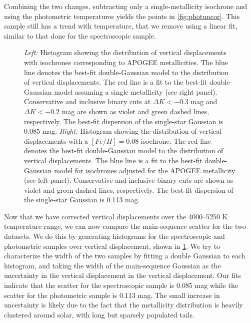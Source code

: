 \documentclass[manuscript]{aastex6}
\begin{document}
Combining the two changes, subtracting only a single-metallicity isochrone and
using the photometric temperatures yields the points in \cref{fig:photuncor}.
This sample still has a trend with temperature, that we remove using a linear
fit, similar to that done for the spectroscopic sample.

\begin{figure}[htb]
    \centering
    \caption{\emph{Left:} Histogram showing the distribution of vertical 
        displacements with isochrones corresponding to APOGEE metallicities.
        The blue line denotes the best-fit double-Gaussian model to the
        distribution of vertical displacements. The red line is a fit to the
        best-fit double-Gaussian model assuming a single metallicity (see right
        panel). Conservative and inclusive binary cuts at \(\Delta K < -0.3\)
        mag and \(\Delta K < -0.2\) mag are shown as violet and green dashed 
        lines, respectively. The best-fit dispersion of the single-star 
        Gaussian is 0.085 mag. \emph{Right:} Histogram showing the 
        distribution of vertical displacements with a \([Fe/H] = 0.08\) 
        isochrone. The red line denotes the best-fit double-Gaussian model to
        the distribution of vertical displacements. The blue line is a fit to
        the best-fit double-Gaussian model for isochrones adjusted for the
        APOGEE metallicity (see left panel). Conservative and inclusive binary
        cuts are shown as violet and green dashed lines, respectively. The
        best-fit dispersion of the single-star Gaussian is 0.113 
    mag.}\label{fig:histcompare}
\end{figure}

Now that we have corrected vertical displacements over the 4000--5250 K
temperature range, we can now compare the main-sequence scatter for the two
datasets. We do this by generating histograms for the spectroscopic and
photometric samples over vertical displacement, shown in
\cref{fig:histcompare}. We try to characterize the width of the two samples by
fitting a double Gaussian to each histogram, and taking the width of the
main-sequence Gaussian as the uncertainty in the vertical displacement in the
vertical displacement. Our fits indicate that the scatter for the spectroscopic
sample is 0.085 mag while the scatter for the photometric sample is 0.113 mag.
The small increase in uncertainty is likely due to the fact that the
metallicity distribution is heavily clustered around solar, with long but
sparsely populated tails.
\end{document}
